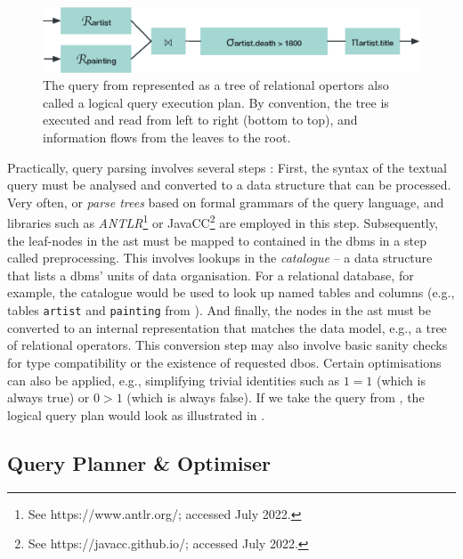 \begin{figure}[tb]
    \centering
    \includegraphics[width=\textwidth]{figures/query-tree.eps}
    \caption{The query from  represented as a tree of relational opertors also called a logical query execution plan. By convention, the tree is executed and read from left to right (bottom to top), and information flows from the leaves to the root.}
    \label{figure:query-tree}
\end{figure}

Practically, query parsing involves several steps \cite{Graefe:1993Query,Garcia:2009Database}: First, the syntax of the textual query must be analysed and converted to a data structure that can be processed. Very often,  or \emph{parse trees} based on formal grammars of the query language, and libraries such as \emph{ANTLR}\footnote{See https://www.antlr.org/; accessed July 2022.} or JavaCC\footnote{See https://javacc.github.io/; accessed July 2022.} are employed in this step. Subsequently, the leaf-nodes in the \acrshort{ast} must be mapped to  contained in the \acrshort{dbms} in a step called preprocessing. This involves lookups in the \emph{catalogue} -- a data structure that lists a \acrshort{dbms}' units of data organisation. For a relational database, for example, the catalogue would be used to look up named tables and columns (e.g., tables \texttt{artist} and \texttt{painting} from ). And finally, the nodes in the \acrshort{ast} must be converted to an internal representation that matches the data model, e.g., a tree of relational operators. This conversion step may also involve basic sanity checks for type compatibility or the existence of requested \acrshort{dbo}s. Certain optimisations can also be applied, e.g., simplifying trivial identities such as $1 = 1$ (which is always true) or $0 > 1$ (which is always false). If we take the query from , the logical query plan would look as illustrated in .

\subsection{Query Planner \& Optimiser}


